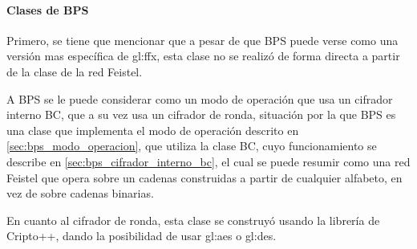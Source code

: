 %
%
%

\paragraph{Clases de BPS}

Primero, se tiene que mencionar que a pesar de que BPS puede verse como una
versión mas específica de \gls{gl:ffx}, esta clase no se realizó de forma
directa a partir de la clase de la red Feistel.

A BPS se le puede considerar como un modo de operación que usa un cifrador
interno BC, que a su vez usa un cifrador de ronda, situación por la que BPS
es una clase que implementa el modo de operación descrito en
\ref{sec:bps_modo_operacion}, que utiliza la clase BC, cuyo funcionamiento se
describe en \ref{sec:bps_cifrador_interno_bc}, el cual se puede resumir como
una red Feistel que opera sobre un cadenas construidas a partir de cualquier
alfabeto, en vez de sobre cadenas binarias.

En cuanto al cifrador de ronda, esta clase se construyó usando la librería de
Cripto++, dando la posibilidad de usar \gls{gl:aes} o \gls{gl:des}.
